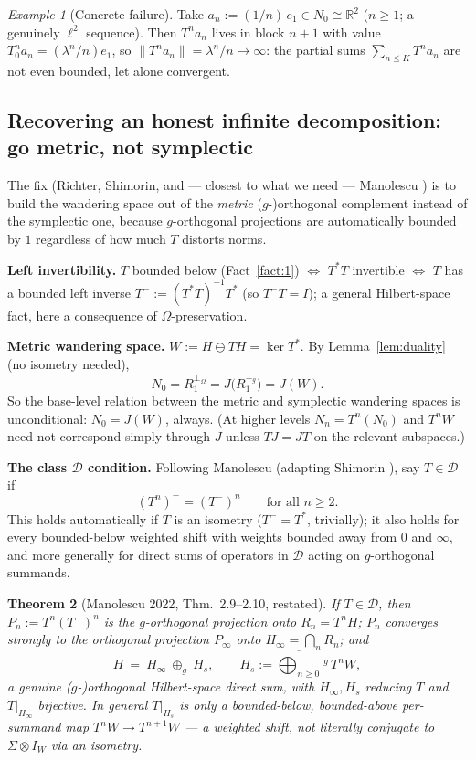 \documentclass[11pt,a4paper]{article}
\newtheorem{theorem}{Theorem}[section]
\theoremstyle{definition}
\theoremstyle{remark}
\newtheorem{example}[theorem]{Example}
\newcommand{\R}{\mathbb{R}}
\newcommand{\cJ}{J}
\newcommand{\Om}{\Omega}
\newcommand{\pO}{\perp_\Omega}
\newcommand{\pg}{\perp_g}
\begin{document}
\begin{example}[Concrete failure]
Take $a_n:=(1/n)\,e_1\in N_0\cong\R^2$ ($n\ge1$; a genuinely $\ell^2$ sequence). Then
$T^na_n$ lives in block $n+1$ with value $T_0^na_n=(\lambda^n/n)e_1$, so
$\|T^na_n\|=\lambda^n/n\to\infty$: the partial sums $\sum_{n\le K}T^na_n$ are not even
bounded, let alone convergent.
\end{example}

\subsection{Recovering an honest infinite decomposition: go metric, not symplectic}

The fix (Richter, Shimorin, and --- closest to what we need --- Manolescu \cite{manolescu2022})
is to build the wandering space out of the \emph{metric} ($g$-)orthogonal complement instead
of the symplectic one, because $g$-orthogonal projections are automatically bounded by $1$
regardless of how much $T$ distorts norms.

\textbf{Left invertibility.} $T$ bounded below (Fact~\ref{fact:1}) $\iff$ $T^{*}T$ invertible
$\iff$ $T$ has a bounded left inverse $T^{-}:=(T^{*}T)^{-1}T^{*}$ (so $T^{-}T=I$); a general
Hilbert-space fact, here a consequence of $\Om$-preservation.

\textbf{Metric wandering space.} $W:=H\ominus TH=\ker T^{*}$. By Lemma~\ref{lem:duality}
(no isometry needed),
\[
N_0=R_1^{\pO}=\cJ\big(R_1^{\pg}\big)=\cJ(W).
\]
So the base-level relation between the metric and symplectic wandering spaces is
unconditional: $N_0=\cJ(W)$, always. (At higher levels $N_n=T^n(N_0)$ and $T^nW$ need not
correspond simply through $\cJ$ unless $T\cJ=\cJ T$ on the relevant subspaces.)

\textbf{The class $\mathcal D$ condition.} Following Manolescu (adapting Shimorin
\cite{shimorin2001}), say $T\in\mathcal D$ if
\[
(T^{n})^{-}=(T^{-})^{n}\qquad\text{for all }n\ge2.
\]
This holds automatically if $T$ is an isometry ($T^-=T^*$, trivially); it also holds for
every bounded-below weighted shift with weights bounded away from $0$ and $\infty$, and
more generally for direct sums of operators in $\mathcal D$ acting on $g$-orthogonal
summands.

\begin{theorem}[Manolescu 2022, Thm.\ 2.9--2.10, restated]
\label{thm:manolescu}
If $T\in\mathcal D$, then $P_n:=T^{n}(T^{-})^{n}$ is the $g$-orthogonal projection onto
$R_n=T^nH$; $P_n$ converges strongly to the orthogonal projection $P_\infty$ onto
$H_\infty=\bigcap_nR_n$; and
\[
H\ =\ H_\infty\ \oplus_g\ H_s,\qquad H_s:=\overline{\bigoplus_{n\ge0}}{}^{\,g}\,T^{n}W,
\]
a genuine ($g$-)orthogonal Hilbert-space direct sum, with $H_\infty,H_s$ reducing $T$ and
$T|_{H_\infty}$ bijective. In general $T|_{H_s}$ is only a bounded-below, bounded-above
per-summand map $T^nW\to T^{n+1}W$ --- a \emph{weighted} shift, not literally conjugate to
$\Sigma\otimes I_W$ via an isometry.
\end{theorem}
\end{document}
